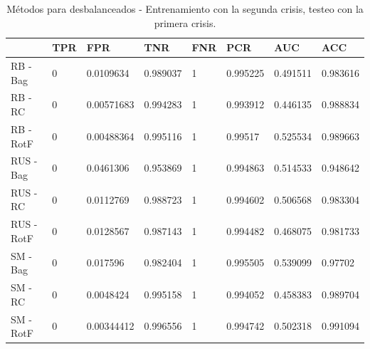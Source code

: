 \documentclass[a4paper,12pt,twoside,oldfontcommands]{memoir}
\begin{document}
\begin{table}\scriptsize
    \begin{center}
        \begin{tabular}{llllllll}
            \toprule
            {} & TPR &         FPR &       TNR & FNR &       PCR &       AUC &       ACC \\
            \midrule
            RB - Bag                &   0 &   0.0109634 &  0.989037 &   1 &  0.995225 &  0.491511 &  0.983616 \\
            RB - RC       &   0 &  0.00571683 &  0.994283 &   1 &  0.993912 &  0.446135 &  0.988834 \\
            RB - RotF        &   0 &  0.00488364 &  0.995116 &   1 &   0.99517 &  0.525534 &  0.989663 \\
            RUS - Bag          &   0 &   0.0461306 &  0.953869 &   1 &  0.994863 &  0.514533 &  0.948642 \\
            RUS - RC &   0 &   0.0112769 &  0.988723 &   1 &  0.994602 &  0.506568 &  0.983304 \\
            RUS - RotF  &   0 &   0.0128567 &  0.987143 &   1 &  0.994482 &  0.468075 &  0.981733 \\
            SM - Bag                         &   0 &    0.017596 &  0.982404 &   1 &  0.995505 &  0.539099 &   0.97702 \\
            SM - RC                &   0 &   0.0048424 &  0.995158 &   1 &  0.994052 &  0.458383 &  0.989704 \\
            SM - RotF                 &   0 &  0.00344412 &  0.996556 &   1 &  0.994742 &  0.502318 &  0.991094 \\
            \bottomrule
        \end{tabular}
        \caption{Métodos para desbalanceados - Entrenamiento con la segunda crisis, testeo con la primera crisis.}
        \label{tab:crisis2}
    \end{center}
\end{table}
\end{document}
